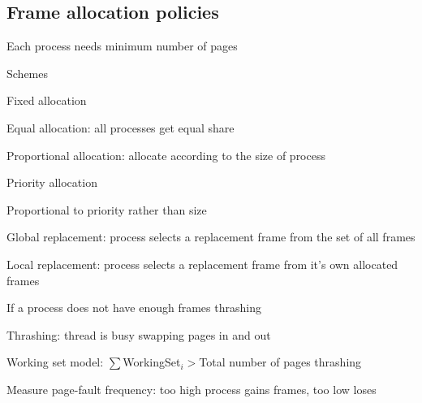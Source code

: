 \subsection{Frame allocation policies}
\enumstart
	\item Each process needs minimum number of pages
	\item Schemes
	\enumstart
		\item Fixed allocation
		\enumstart
			\item Equal allocation: all processes get equal share
			\item Proportional allocation: allocate according to the size of process
		\enumend
		\item Priority allocation
		\enumstart
			\item Proportional to priority rather than size
		\enumend
	\enumend
	\item Global replacement: process selects a replacement frame from the set of all frames
	\item Local replacement: process selects a replacement frame from it's own allocated frames
	\item If a process does not have enough frames \arrow thrashing
	\item Thrashing: thread is busy swapping pages in and out
	\item Working set model: $\sum$WorkingSet$_i >$Total number of pages \arrow thrashing
	\item Measure page-fault frequency: too high \arrow process gains frames, too low \arrow loses
\enumend
